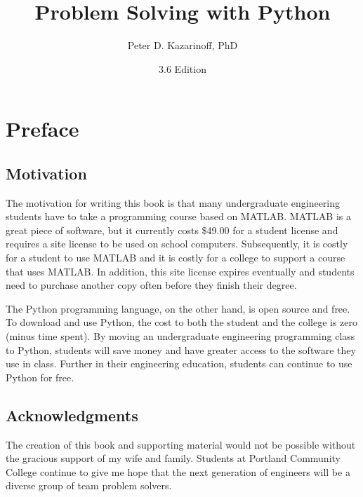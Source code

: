 \documentclass{book}
\title{Problem Solving with Python}
\author{Peter D. Kazarinoff, PhD}
\date{3.6 Edition}
\begin{document}
    
    
    
    \maketitle
    
    
    \tableofcontents


    

    
        \chapter{Preface}\label{preface}
    




    
        \section{Motivation}\label{motivation}
    




    
        The motivation for writing this book is that many undergraduate
engineering students have to take a programming course based on MATLAB.
MATLAB is a great piece of software, but it currently costs \$49.00 for
a student license and requires a site license to be used on school
computers. Subsequently, it is costly for a student to use MATLAB and it
is costly for a college to support a course that uses MATLAB. In
addition, this site license expires eventually and students need to
purchase another copy often before they finish their degree.

The Python programming language, on the other hand, is open source and
free. To download and use Python, the cost to both the student and the
college is zero (minus time spent). By moving an undergraduate
engineering programming class to Python, students will save money and
have greater access to the software they use in class. Further in their
engineering education, students can continue to use Python for free.
    




    
        \section{Acknowledgments}\label{acknowledgments}
    




    
        The creation of this book and supporting material would not be possible
without the gracious support of my wife and family. Students at Portland
Community College continue to give me hope that the next generation of
engineers will be a diverse group of team problem solvers.
\end{document}
